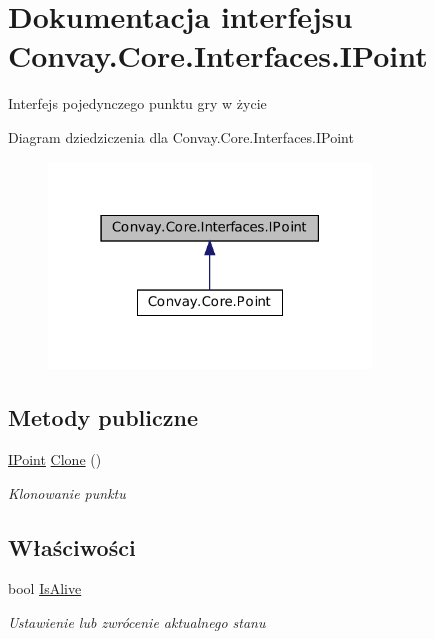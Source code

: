 \hypertarget{interface_convay_1_1_core_1_1_interfaces_1_1_i_point}{}\section{Dokumentacja interfejsu Convay.\+Core.\+Interfaces.\+I\+Point}
\label{interface_convay_1_1_core_1_1_interfaces_1_1_i_point}


Interfejs pojedynczego punktu gry w życie  




Diagram dziedziczenia dla Convay.\+Core.\+Interfaces.\+I\+Point
\nopagebreak
\begin{figure}[H]
\begin{center}
\leavevmode
\includegraphics[width=243pt]{interface_convay_1_1_core_1_1_interfaces_1_1_i_point__inherit__graph}
\end{center}
\end{figure}
\subsection*{Metody publiczne}
\begin{DoxyCompactItemize}
\item 
\hyperlink{interface_convay_1_1_core_1_1_interfaces_1_1_i_point}{I\+Point} \hyperlink{interface_convay_1_1_core_1_1_interfaces_1_1_i_point_a4747dab5c78f8a41d079c15416825fcf}{Clone} ()
\begin{DoxyCompactList}\small\item\em Klonowanie punktu \end{DoxyCompactList}\end{DoxyCompactItemize}
\subsection*{Właściwości}
\begin{DoxyCompactItemize}
\item 
bool \hyperlink{interface_convay_1_1_core_1_1_interfaces_1_1_i_point_a0a36d897859f1277414d4acc77b3f037}{Is\+Alive}
\begin{DoxyCompactList}\small\item\em Ustawienie lub zwrócenie aktualnego stanu \end{DoxyCompactList}\end{DoxyCompactItemize}


